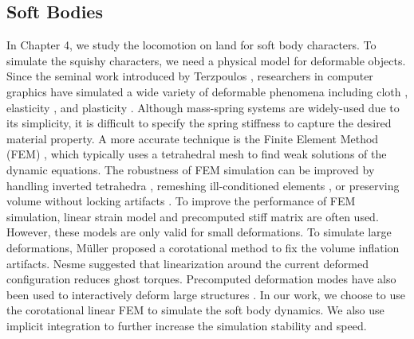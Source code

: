 \subsection{Soft Bodies}
In Chapter 4, we study the locomotion on land for soft body characters. To simulate the squishy characters, we need a physical model for deformable objects.
Since the seminal work introduced by Terzpoulos
\cite{Terzopoulos:1987}, researchers in computer graphics have
simulated a wide variety of deformable phenomena including cloth
\cite{Baraff:1998,Bridson:2002}, elasticity \cite{Muller:2002}, and
plasticity \cite{O'Brien:1999,Bargteil:2007}. Although mass-spring systems \cite{Provot:1996,Liu:2013} are
widely-used due to its simplicity, it is difficult to
specify the spring stiffness to capture the desired material property. A more accurate technique is
the Finite Element Method (FEM) \cite{Bathe:2007}, which typically uses a
tetrahedral mesh to find weak solutions of the dynamic
equations. The robustness of FEM simulation can be improved by
handling inverted tetrahedra \cite{Irving:2004}, remeshing
ill-conditioned elements \cite{Bargteil:2007}, or preserving volume
without locking artifacts \cite{Irving:2007}. To improve the
performance of FEM simulation, linear strain model and precomputed
stiff matrix are often used. However, these models are only valid for
small deformations. To simulate large deformations, M\"{u}ller \etal
\cite{Muller:2002} proposed a corotational method to fix the
volume inflation artifacts. Nesme \etal \cite{NPF05} suggested
that linearization around the current deformed configuration reduces
ghost torques. Precomputed deformation modes have also been used to
interactively deform large structures
\cite{James:2003,Barbic:2005,Kim:2009}. In our work, we choose to use the corotational linear FEM \cite{Muller:2002,NPF05}
to simulate the soft body dynamics. We also use implicit integration to further increase the simulation stability and speed.


